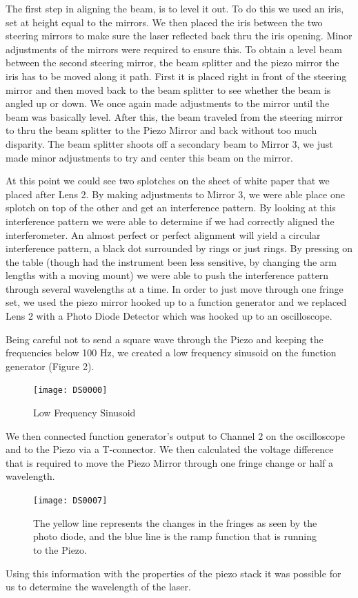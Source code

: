 The first step in aligning the beam, is to level it out. To do this we used an iris, set at height equal to the mirrors. We then placed the iris between the two steering mirrors to make sure the laser reflected back thru the iris opening. Minor adjustments of the mirrors were required to ensure this.  To obtain a level beam between the second steering mirror, the beam splitter and the piezo mirror the iris has to be moved along it path. First it is placed right in front of the steering mirror and then moved back to the beam splitter to see whether the beam is angled up or down. We once again made adjustments to the mirror until the beam was basically level. After this, the beam traveled from the steering mirror to thru the beam splitter to the Piezo Mirror and back without too much disparity. The beam splitter shoots off a secondary beam to Mirror 3, we just made minor adjustments to try and center this beam on the mirror. 

At this point we could see two splotches on the sheet of white paper that we placed after Lens 2. By making adjustments to Mirror 3, we were able place one splotch on top of the other and get an interference pattern. By looking at this interference pattern we were able to determine if we had correctly aligned the interferometer. An almost perfect or perfect alignment will yield a circular interference pattern, a black dot surrounded by rings or just rings. By pressing on the table (though had the instrument been less sensitive, by changing the arm lengths with a moving mount) we were able to push the interference pattern through several wavelengths at a time. In order to just move through one fringe set, we used the piezo mirror hooked up to a function generator and we replaced Lens 2 with a Photo Diode Detector which was hooked up to an oscilloscope.

Being careful not to send a square wave through the Piezo and keeping the frequencies below 100 Hz, we created a low frequency sinusoid on the function generator (Figure 2).

		\begin{figure}[ht!]
		\centering
		\texttt{[image: DS0000]}
		\caption{Low Frequency Sinusoid}
		\end{figure}

We then connected function generator's output to Channel 2 on the oscilloscope and to the Piezo via a T-connector. We then calculated the voltage difference that is required to move the Piezo Mirror through one fringe change or half a wavelength.

		\begin{figure}[ht!]
		\centering
		\texttt{[image: DS0007]}
		\caption{The yellow line represents the changes in the fringes as seen by the photo diode, and the blue line is the ramp function that is running to the Piezo.}
		\end{figure}	
 Using this information with the properties of the piezo stack it was possible for us to determine the wavelength of the laser.
